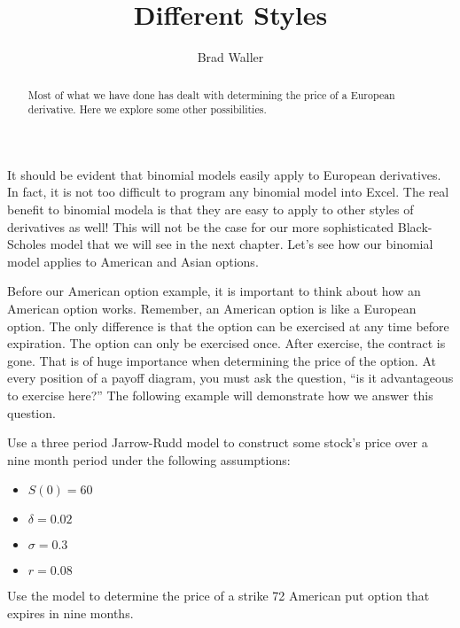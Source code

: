 \documentclass{ximera}
\author{Brad Waller}
\title{Different Styles}
\begin{document}
\begin{abstract}
Most of what we have done has dealt with determining the price of a European derivative. Here we explore some other possibilities.
\end{abstract}

\maketitle

It should be evident that binomial models easily apply to European derivatives. In fact, it is not too difficult to program any binomial model into Excel. The real benefit to binomial modela is that they are easy to apply to other styles of derivatives as well! This will not be the case for our more sophisticated Black-Scholes model that we will see in the next chapter. Let's see how our binomial model applies to American and Asian options.

Before our American option example, it is important to think about how an American option works. Remember, an American option is like a European option. The only difference is that the option can be exercised at any time before expiration. The option can only be exercised once. After exercise, the contract is gone. That is of huge importance when determining the price of the option. At every position of a payoff diagram, you must ask the question, ``is it advantageous to exercise here?'' The following example will demonstrate how we answer this question. 

\begin{example}
Use a three period Jarrow-Rudd model to construct some stock's price over a nine month period under the following assumptions:
	\begin{itemize}
	\item $S(0)=60$
	\item $\delta=0.02$
	\item $\sigma=0.3$
	\item $r=0.08$
	\end{itemize}
Use the model to determine the price of a strike 72 American put option that expires in nine months.
\end{example}
\end{document}
